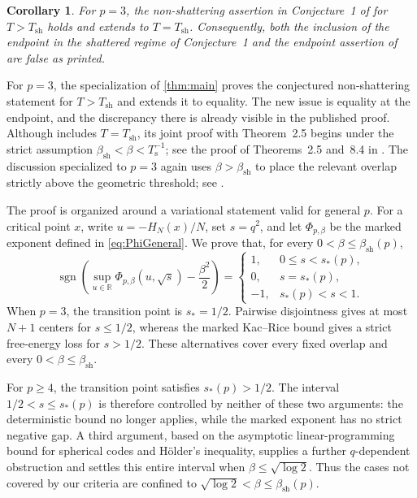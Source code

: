\documentclass[11pt,reqno]{amsart}
\numberwithin{equation}{section}
\theoremstyle{plain}
\newtheorem{corollary}[corollary]{Corollary}
\theoremstyle{definition}
\theoremstyle{remark}
\newcommand{\R}{\mathbb R}
\newcommand{\1}{\mathbf 1}
\newcommand{\bsh}{\beta_{\mathrm{sh}}}
\newcommand{\Tsh}{T_{\mathrm{sh}}}
\newcommand{\Ts}{T_{\mathrm{s}}}
\begin{document}
\begin{corollary}\label{cor:conjecture}
For \(p=3\), the non-shattering assertion in Conjecture~1 of
\cite{BenArousJagannath2024} for \(T>T_{\mathrm{sh}}\) holds and extends
to \(T=T_{\mathrm{sh}}\).  Consequently, both the inclusion of the
endpoint in the shattered regime of Conjecture~1 and the endpoint
assertion of \cite[Theorem~8.4]{BenArousJagannath2024} are false as
printed.
\end{corollary}

For \(p=3\), the specialization of \cref{thm:main} proves the
conjectured non-shattering statement for \(T>T_{\mathrm{sh}}\) and
extends it to equality.  The new issue is equality at the endpoint,
and the discrepancy there is already visible in the published proof.  Although
\cite[Theorem~8.4]{BenArousJagannath2024} includes \(T=\Tsh\), its joint
proof with Theorem~2.5 begins under the strict assumption
\(\bsh<\beta<\Ts^{-1}\); see the proof of Theorems~2.5 and~8.4 in
\cite[Section~5]{BenArousJagannath2024}.  The discussion specialized to
\(p=3\) again uses \(\beta>\bsh\) to place the relevant overlap strictly
above the geometric threshold; see \cite[Section~8]{BenArousJagannath2024}.

The proof is organized around a variational statement valid for general
\(p\).  For a critical point \(x\), write \(u=-H_N(x)/N\), set
\(s=q^2\), and let \(\Phi_{p,\beta}\) be the marked exponent defined in
\eqref{eq:PhiGeneral}.  We prove that, for every
\(0<\beta\leq\beta_{\mathrm{sh}}(p)\),
\begin{equation}\label{eq:introSignLaw}
 \operatorname{sgn}\!\left(
  \sup_{u\in\R}\Phi_{p,\beta}(u,\sqrt s)-\frac{\beta^2}{2}
 \right)
 =\begin{cases}
  1,&0\leq s<s_*(p),\\
  0,&s=s_*(p),\\
  -1,&s_*(p)<s<1.
 \end{cases}
\end{equation}
When \(p=3\), the transition point is \(s_*=1/2\).  Pairwise
disjointness gives at most \(N+1\) centers for \(s\leq1/2\), whereas
the marked Kac--Rice bound gives a strict free-energy loss for
\(s>1/2\).  These alternatives cover every fixed overlap and every
\(0<\beta\leq\bsh\).

For \(p\geq4\), the transition point satisfies \(s_*(p)>1/2\).  The
interval \(1/2<s\leq s_*(p)\) is therefore controlled by neither of
these two arguments: the deterministic bound no longer applies, while
the marked exponent has no strict negative gap.  A third argument,
based on the asymptotic linear-programming bound for spherical codes
and H\"older's inequality, supplies a further \(q\)-dependent
obstruction and settles this entire interval when
\(\beta\leq\sqrt{\log2}\).  Thus the cases not covered by our criteria
are confined to \(\sqrt{\log2}<\beta\leq\beta_{\mathrm{sh}}(p)\).
\end{document}
